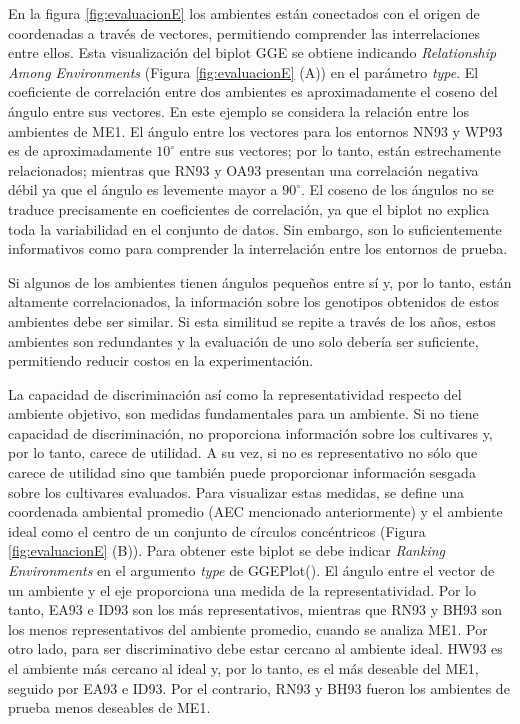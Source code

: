 En la figura \ref{fig:evaluacionE} los ambientes están conectados con el origen de coordenadas a través de vectores, permitiendo comprender las interrelaciones entre ellos.  Esta visualización del biplot GGE se obtiene indicando \emph{Relationship Among Environments} (Figura \ref{fig:evaluacionE} (A)) en el parámetro \emph{type}. El coeficiente de correlación entre dos ambientes es aproximadamente el coseno del ángulo entre sus vectores. 
En este ejemplo se considera la relación entre los ambientes de ME1. El ángulo entre los vectores para los entornos NN93 y WP93 es de aproximadamente $10^{\circ}$ entre sus vectores; por lo tanto, están estrechamente relacionados; mientras que RN93 y OA93 presentan una correlación negativa débil ya que el ángulo es levemente mayor a $90^{\circ}$. El coseno de los ángulos no se traduce precisamente en coeficientes de correlación, ya que el biplot no explica toda la variabilidad en el conjunto de datos. Sin embargo, son lo suficientemente informativos como para comprender la interrelación entre los entornos de prueba. 

Si algunos de los ambientes tienen ángulos pequeños entre sí y, por lo tanto, están altamente correlacionados, la información sobre los genotipos obtenidos de estos ambientes debe ser similar. Si esta similitud se repite a través de los años, estos ambientes son redundantes y la evaluación de uno solo debería ser suficiente, permitiendo reducir costos en la experimentación.


La capacidad de discriminación así como la representatividad respecto del ambiente objetivo, son medidas fundamentales para un ambiente. Si no tiene capacidad de discriminación, no proporciona información sobre los cultivares y, por lo tanto, carece de utilidad. A su vez, si no es representativo no sólo que carece de utilidad sino que también puede proporcionar información sesgada sobre los cultivares evaluados. Para visualizar estas medidas, se define una coordenada ambiental promedio (AEC mencionado anteriormente) y el ambiente ideal como el centro de un conjunto de círculos concéntricos (Figura \ref{fig:evaluacionE} (B)). Para obtener este biplot se debe indicar \emph{Ranking Environments} en el argumento \emph{type} de \textcolor{fandango}{GGEPlot()}. El ángulo entre el vector de un ambiente y el eje proporciona una medida de la representatividad. Por lo tanto, EA93 e ID93 son los más representativos, mientras que RN93 y BH93 son los menos representativos del ambiente promedio, cuando se analiza ME1. Por otro lado, para ser discriminativo debe estar cercano al ambiente ideal. HW93 es el ambiente más cercano al ideal y, por lo tanto, es el más deseable del ME1, seguido por EA93 e ID93. Por el contrario, RN93 y BH93 fueron los ambientes de prueba menos deseables de ME1. 

